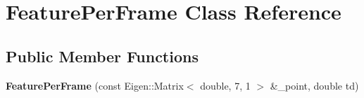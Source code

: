 \hypertarget{classFeaturePerFrame}{}\section{Feature\+Per\+Frame Class Reference}
\label{classFeaturePerFrame}
\subsection*{Public Member Functions}
\begin{DoxyCompactItemize}
\item 
\mbox{\label{classFeaturePerFrame_aadf6f8b994cd5b7f38196e12c8ffa043}} 
{\bfseries Feature\+Per\+Frame} (const Eigen\+::\+Matrix$<$ double, 7, 1 $>$ \&\+\_\+point, double td)
\end{DoxyCompactItemize}
